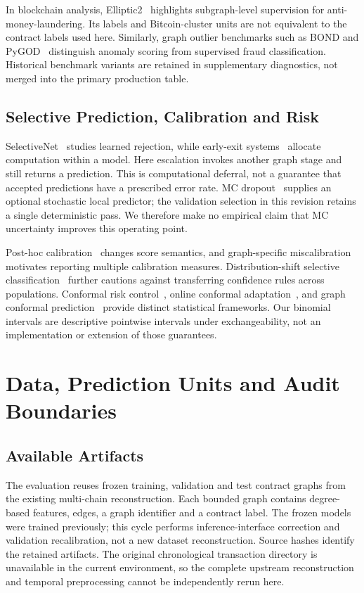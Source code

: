 \documentclass[10pt,journal]{IEEEtran}
\begin{document}
In blockchain analysis, Elliptic2~\cite{bellei2024elliptic2} highlights subgraph-level supervision for anti-money-laundering. Its labels and Bitcoin-cluster units are not equivalent to the contract labels used here. Similarly, graph outlier benchmarks such as BOND and PyGOD~\cite{liu2022bond,liu2024pygod} distinguish anomaly scoring from supervised fraud classification. Historical benchmark variants are retained in supplementary diagnostics, not merged into the primary production table.

\subsection{Selective Prediction, Calibration and Risk}
SelectiveNet~\cite{geifman2019selectivenet} studies learned rejection, while early-exit systems~\cite{teerapittayanon2016branchynet} allocate computation within a model. Here escalation invokes another graph stage and still returns a prediction. This is computational deferral, not a guarantee that accepted predictions have a prescribed error rate. MC dropout~\cite{gal2016dropout} supplies an optional stochastic local predictor; the validation selection in this revision retains a single deterministic pass. We therefore make no empirical claim that MC uncertainty improves this operating point.

Post-hoc calibration~\cite{guo2017calibration} changes score semantics, and graph-specific miscalibration~\cite{hsu2022what} motivates reporting multiple calibration measures. Distribution-shift selective classification~\cite{liang2024selective} further cautions against transferring confidence rules across populations. Conformal risk control~\cite{angelopoulos2024crc}, online conformal adaptation~\cite{bhatnagar2023online}, and graph conformal prediction~\cite{zargarbashi2023conformal,zhang2025residual} provide distinct statistical frameworks. Our binomial intervals are descriptive pointwise intervals under exchangeability, not an implementation or extension of those guarantees.

\section{Data, Prediction Units and Audit Boundaries}
\subsection{Available Artifacts}
The evaluation reuses frozen training, validation and test contract graphs from the existing multi-chain reconstruction. Each bounded graph contains degree-based features, edges, a graph identifier and a contract label. The frozen models were trained previously; this cycle performs inference-interface correction and validation recalibration, not a new dataset reconstruction. Source hashes identify the retained artifacts. The original chronological transaction directory is unavailable in the current environment, so the complete upstream reconstruction and temporal preprocessing cannot be independently rerun here.
\end{document}

